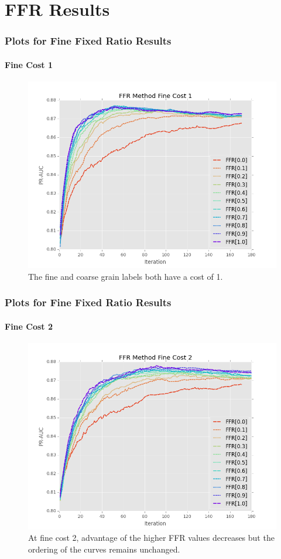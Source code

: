 \documentclass{beamer}
\begin{document}
\section{FFR Results}
\begin{frame}
    \frametitle{Plots for Fine Fixed Ratio Results}
    \framesubtitle{Fine Cost 1}
    \begin{figure}[!htb]
	\centering
    \includegraphics[width=0.8\columnwidth]{fig/ParamsFFR_PR_Cost1_rnds0_180}
    \caption{The fine and coarse grain labels
    both have a cost of 1.}
\end{figure}
\end{frame}
\begin{frame}
    \frametitle{Plots for Fine Fixed Ratio Results}
    \framesubtitle{Fine Cost 2}
    \begin{figure}[!htb]
        \centering
        \includegraphics[width=0.8\columnwidth]{fig/ParamsFFR_PR_Cost2_rnds0_180}
        \caption{At fine cost 2, advantage of the higher FFR values decreases but the ordering
        of the curves remains unchanged.}
        \label{fig:ParamsFFR_PR_Cost2_rnds0_180}
    \end{figure}
\end{frame}
\end{document}
